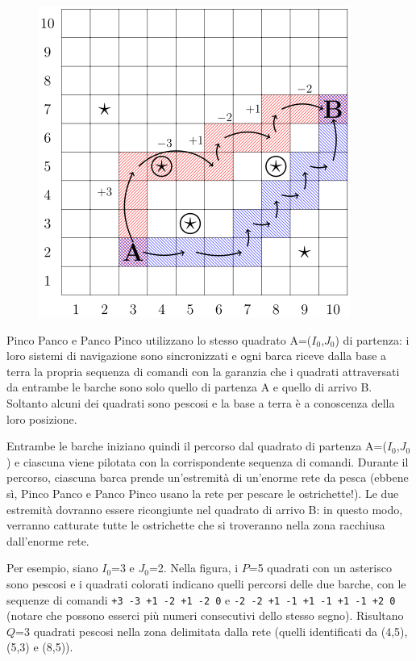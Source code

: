 \documentclass[a4paper,11pt]{article}
\begin{document}
\begin{figure}[h!]
  \centering
  \caption{}
  \includegraphics{mare.png}
\end{figure}


Pinco Panco e Panco Pinco utilizzano lo stesso quadrato
A=($I_{0}$,$J_{0}$) di partenza: i
loro sistemi di navigazione sono sincronizzati e ogni barca riceve
dalla base a terra la propria sequenza di comandi con la garanzia che
i quadrati attraversati da entrambe le barche sono solo quello di
partenza A e quello di arrivo B.  Soltanto alcuni dei quadrati sono
pescosi e la base a terra è a conoscenza della loro posizione.

Entrambe le barche iniziano quindi il percorso dal quadrato di
partenza A=($I_{0}$,$J_{0}$) e
ciascuna viene pilotata con la corrispondente sequenza di comandi.
Durante il percorso, ciascuna barca prende un'estremità di
un'enorme rete da pesca (ebbene sì, Pinco Panco e Panco Pinco
usano la rete per pescare le ostrichette!). Le due estremità
dovranno essere ricongiunte nel quadrato di arrivo B: in questo modo,
verranno catturate tutte le ostrichette che si troveranno nella
zona racchiusa dall'enorme rete.

Per esempio, siano $I_{0}$=3 e
$J_{0}$=2. Nella figura, i
$P$=5 quadrati con un asterisco sono pescosi e i
quadrati colorati indicano quelli percorsi delle due barche, con le
sequenze di comandi \texttt{+3 -3 +1 -2 +1 -2 0} e \texttt{-2 -2 +1
-1 +1 -1 +1 -1 +2 0} (notare che possono esserci più
numeri consecutivi dello stesso segno).  Risultano $Q$=3
quadrati pescosi nella zona delimitata dalla rete (quelli identificati
da (4,5), (5,3) e (8,5)).
\end{document}
